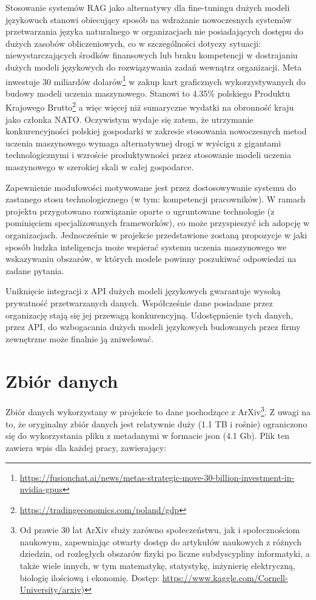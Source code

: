 \documentclass[10pt]{article}
\begin{document}
Stosowanie systemów RAG jako alternatywy dla fine-tuningu dużych modeli językowuch stanowi obiecujący sposób na wdrażanie nowoczesnych systemów przetwarzania języka naturalnego w organizacjach nie posiadających dostępu do dużych zasobów obliczeniowych, co w szczególności dotyczy sytuacji: niewystarczających środków finansowych lub braku kompetencji w dostrajaniu dużych modeli językowych do rozwiązywania zadań wewnątrz organizacji. Meta inwestuje 30 miliardów dolarów\footnote{\url{https://fusionchat.ai/news/metas-strategic-move-30-billion-investment-in-nvidia-gpus}} w zakup kart graficznych wykorzystywanych do budowy modeli uczenia maszynowego. Stanowi to 4.35\% polskiego Produktu Krajowego Brutto\footnote{\url{https://tradingeconomics.com/poland/gdp}} a więc więcej niż sumaryczne wydatki na obronność kraju jako członka NATO. Oczywistym wydaje się zatem, że utrzymanie konkurencyjności polskiej gospodarki w zakresie stosowania nowoczesnych metod uczenia maszynowego wymaga alternatywnej drogi w wyścigu z gigantami technologicznymi i wzroście produktywności przez stosowanie modeli uczenia maszynowego w szerokiej skali w całej gospodarce.

Zapewnienie modułowości motywowane jest przez dostosowywanie systemu do zastanego stosu technologicznego (w tym: kompetencji pracowników). W ramach projektu przygotowano rozwiązanie oparte o ugruntowane technologie (z pominięciem specjalizowanych frameworków), co może przyspieszyć ich adopcję w organizacjach. Jednocześnie w projekcie przedstawione zostaną propozycje w jaki sposób ludzka inteligencja może wspierać systemu uczenia maszynowego we wskazywaniu obszarów, w których modele powinny poszukiwać odpowiedzi na zadane pytania.

Uniknięcie integracji z API dużych modeli językowych gwarantuje wysoką prywatność przetwarzanych danych. Współcześnie dane posiadane przez organizację stają się jej przewagą konkurencyjną. Udostępnienie tych danych, przez API, do wzbogacania dużych modeli językowych budowanych przez firmy zewnętrzne może finalnie ją zniwelować.

\section{Zbiór danych}

Zbiór danych wykorzystany w projekcie to dane pochodzące z ArXiv\footnote{Od prawie 30 lat ArXiv służy zarówno społeczeństwu, jak i społecznościom naukowym, zapewniając otwarty dostęp do artykułów naukowych z różnych dziedzin, od rozległych obszarów fizyki po liczne subdyscypliny informatyki, a także wiele innych, w tym matematykę, statystykę, inżynierię elektryczną, biologię ilościową i ekonomię. Dostęp: \url{https://www.kaggle.com/Cornell-University/arxiv})}. Z uwagi na to, że oryginalny zbiór danych jest relatywnie duży (1.1 TB i rośnie) ograniczono się do wykorzystania pliku z metadanymi w formacie json (4.1 Gb). Plik ten zawiera wpis dla każdej pracy, zawierający:
\end{document}
